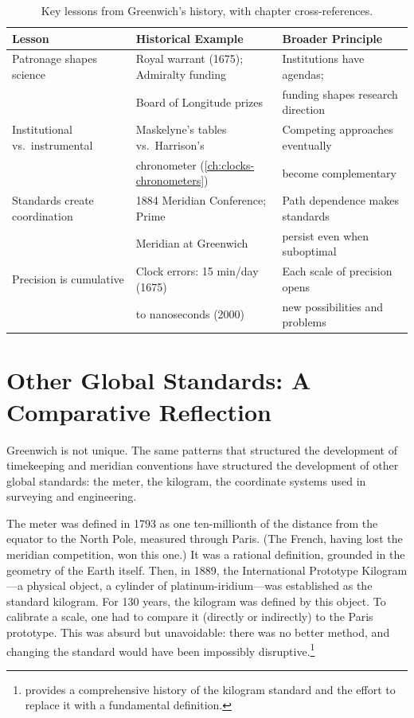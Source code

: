 \begin{table}[!ht]
  \centering
  \caption{Key lessons from Greenwich's history, with chapter cross-references.}
  \label{tab:key-lessons}
  \small
  \begin{tabularx}{\linewidth}{lXX}
    \toprule
    \textbf{Lesson} & \textbf{Historical Example} & \textbf{Broader Principle} \\
    \midrule
    Patronage shapes science & Royal warrant (1675); Admiralty funding & Institutions have agendas; \\
    & Board of Longitude prizes & funding shapes research direction \\
    \midrule
    Institutional vs.\ instrumental & Maskelyne's tables vs.\ Harrison's & Competing approaches eventually \\
    & chronometer (\cref{ch:clocks-chronometers}) & become complementary \\
    \midrule
    Standards create coordination & 1884 Meridian Conference; Prime & Path dependence makes standards \\
    & Meridian at Greenwich & persist even when suboptimal \\
    \midrule
    Precision is cumulative & Clock errors: 15 min/day (1675) & Each scale of precision opens \\
    & to nanoseconds (2000) & new possibilities and problems \\
    \bottomrule
  \end{tabularx}
\end{table}

\section{Other Global Standards: A Comparative Reflection}

Greenwich is not unique. The same patterns that structured the development of timekeeping and meridian conventions have structured the development of other global standards: the meter, the kilogram, the coordinate systems used in surveying and engineering.

The meter was defined in 1793 as one ten-millionth of the distance from the equator to the North Pole, measured through Paris. (The French, having lost the meridian competition, won this one.) It was a rational definition, grounded in the geometry of the Earth itself. Then, in 1889, the International Prototype Kilogram---a physical object, a cylinder of platinum-iridium---was established as the standard kilogram. For 130 years, the kilogram was defined by this object. To calibrate a scale, one had to compare it (directly or indirectly) to the Paris prototype. This was absurd but unavoidable: there was no better method, and changing the standard would have been impossibly disruptive.\footnote{\textcite{Quinn2012} provides a comprehensive history of the kilogram standard and the effort to replace it with a fundamental definition.}

